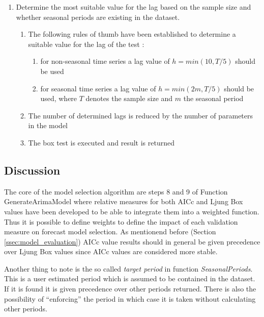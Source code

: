 \begin{enumerate}
	\item Determine the most suitable value for the lag based on the sample size and 
	whether seasonal periods are existing in the dataset. 
	
	\begin{enumerate}
		\item The following rules of thumb have been established to determine a suitable value for the lag of the test \cite{hyndman2014blog}: 
		
		\begin{enumerate}
			\item for non-seasonal time series a lag value of $h=min(10,T/5)$ should be used
			\item for seasonal time series a lag value of $h=min(2m,T/5)$ should be used,
				where $T$ denotes the sample size and $m$ the seasonal period
		\end{enumerate}
		
		\item The number of determined lags is reduced by the number of parameters in the model
		
		\item The box test is executed and result is returned
	\end{enumerate}
	
\end{enumerate}


\subsection{Discussion}

The core of the model selection algorithm are steps 8 and 9 of Function GenerateArimaModel where relative measures for both AICc and Ljung Box values have been developed to be able to integrate them into a weighted function. Thus it is possible to define weights to define the impact of each validation measure on forecast model selection. 
As mentionend before (Section \ref{ssec:model_evaluation}) AICc value results should in general be given precedence over Ljung Box values since AICc values are considered more stable. 

Another thing to note is the so called \textit{target period} in function \textit{SeasonalPeriods}. This is a user estimated period which is assumed to be contained in the dataset. If it is found it is given precedence over other periods returned. There is also the possibility of ``enforcing'' the period in which case it is taken without calculating other periods. 






